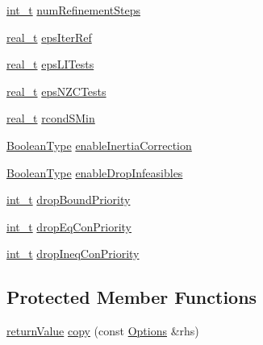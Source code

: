 \begin{DoxyCompactItemize}
\item 
\hyperlink{_types_8hpp_ab6fd6105e64ed14a0c9281326f05e623}{int\+\_\+t} \hyperlink{class_options_a4c9f296e726a52eebbb7cee034c60ad8}{num\+Refinement\+Steps}
\item 
\hyperlink{qp_o_a_s_e_s__wrapper_8h_a0d00e2b3dfadee81331bbb39068570c4}{real\+\_\+t} \hyperlink{class_options_a8d7b0b4ab3311519b73e0c30a98e7295}{eps\+Iter\+Ref}
\item 
\hyperlink{qp_o_a_s_e_s__wrapper_8h_a0d00e2b3dfadee81331bbb39068570c4}{real\+\_\+t} \hyperlink{class_options_af972adad4f56f124531725e1248a51e3}{eps\+L\+I\+Tests}
\item 
\hyperlink{qp_o_a_s_e_s__wrapper_8h_a0d00e2b3dfadee81331bbb39068570c4}{real\+\_\+t} \hyperlink{class_options_a636e3942e0ad78b9c4914541a20b70d0}{eps\+N\+Z\+C\+Tests}
\item 
\hyperlink{qp_o_a_s_e_s__wrapper_8h_a0d00e2b3dfadee81331bbb39068570c4}{real\+\_\+t} \hyperlink{class_options_abb00b9be9b9988884954bbe905ae317f}{rcond\+S\+Min}
\item 
\hyperlink{_types_8hpp_a20f82124c82b6f5686a7fce454ef9089}{Boolean\+Type} \hyperlink{class_options_a52d5f55b5fb0b5ddd52cd8069d3ce477}{enable\+Inertia\+Correction}
\item 
\hyperlink{_types_8hpp_a20f82124c82b6f5686a7fce454ef9089}{Boolean\+Type} \hyperlink{class_options_a471b77ce66c8b16a06e61d94af785f91}{enable\+Drop\+Infeasibles}
\item 
\hyperlink{_types_8hpp_ab6fd6105e64ed14a0c9281326f05e623}{int\+\_\+t} \hyperlink{class_options_a2298b2a19f20494aa1225316a9318e92}{drop\+Bound\+Priority}
\item 
\hyperlink{_types_8hpp_ab6fd6105e64ed14a0c9281326f05e623}{int\+\_\+t} \hyperlink{class_options_a6720a59401830e78e8ff83830fe7f571}{drop\+Eq\+Con\+Priority}
\item 
\hyperlink{_types_8hpp_ab6fd6105e64ed14a0c9281326f05e623}{int\+\_\+t} \hyperlink{class_options_a557c0f1d63e6f4c176ca0447bbf8c92d}{drop\+Ineq\+Con\+Priority}
\end{DoxyCompactItemize}
\subsection*{Protected Member Functions}
\begin{DoxyCompactItemize}
\item 
\hyperlink{_message_handling_8hpp_a81d556f613bfbabd0b1f9488c0fa865e}{return\+Value} \hyperlink{class_options_a095e22d9b8588029781094cccc01e375}{copy} (const \hyperlink{class_options}{Options} \&rhs)
\end{DoxyCompactItemize}


